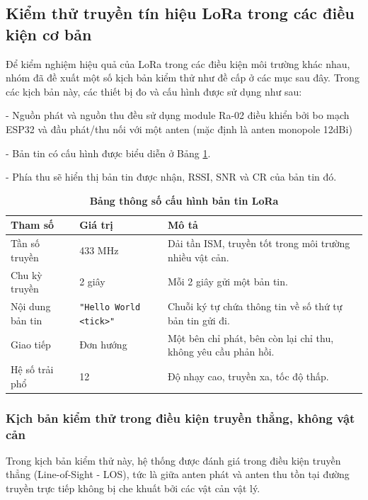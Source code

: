 \documentclass{article}
\begin{document}
	\subsection{Kiểm thử truyền tín hiệu LoRa trong các điều kiện cơ bản}
	
	Để kiểm nghiệm hiệu quả của LoRa trong các điều kiện môi trường khác nhau,
	nhóm đã đề xuất một số kịch bản kiểm thử như đề cấp ở các mục sau đây. Trong các
	kịch bản này, các thiết bị đo và cấu hình được sử dụng như sau:
	
	- Nguồn phát và nguồn thu đều sử dụng module Ra-02 điều khiển bởi bo mạch ESP32
	và đầu phát/thu nối với một anten (mặc định là anten monopole 12dBi)
	
	- Bản tin có cấu hình được biểu diễn ở Bảng \ref{tab31}.
	
	- Phía thu sẽ hiển thị bản tin được nhận, RSSI, SNR và CR của bản tin đó.
	
	\begin{table}[H]
		\caption[Bảng thông số cấu hình bản tin LoRa]{\bfseries \fontsize{12pt}{0pt}\selectfont Bảng thông số cấu hình bản tin LoRa}
		\label{tab31}
		\centering
		\renewcommand{\arraystretch}{1.3}
		\begin{tabular}{|p{3cm}|p{4cm}|p{7.5cm}|} 
			\hline
			\textbf{Tham số} & \textbf{Giá trị} & \textbf{Mô tả} \\ 
			\hline
			Tần số truyền & 433 MHz & Dải tần ISM, truyền tốt trong môi trường nhiều vật cản. \\ 
			\hline
			Chu kỳ truyền & 2 giây & Mỗi 2 giây gửi một bản tin. \\ 
			\hline
			Nội dung bản tin & \texttt{"Hello World <tick>"} & Chuỗi ký tự chứa thông tin về số thứ tự bản tin gửi đi. \\ 
			\hline
			Giao tiếp & Đơn hướng & Một bên chỉ phát, bên còn lại chỉ thu, không yêu cầu phản hồi. \\ 
			\hline
			Hệ số trải phổ & 12 & Độ nhạy cao, truyền xa, tốc độ thấp. \\ 
			\hline
		\end{tabular}
	\end{table}
	
	\subsubsection{Kịch bản kiểm thử trong điều kiện truyền thẳng, không vật cản}
	
	Trong kịch bản kiểm thử này, hệ thống được đánh giá trong điều kiện truyền thẳng (Line-of-Sight - LOS), tức là giữa anten phát và anten thu tồn tại đường truyền trực tiếp không bị che khuất bởi các vật cản vật lý. 
	
\end{document}
